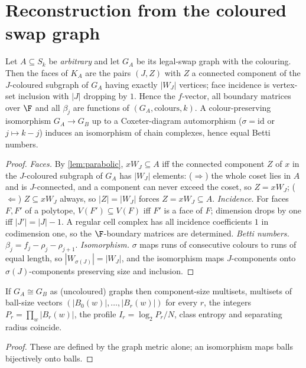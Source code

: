 \section{Reconstruction from the coloured swap graph}
\begin{theorem}[reconstruction of $K_A$]\label{thm:swap-reconstruction}
Let $A\subseteq S_k$ be \emph{arbitrary} and let $G_A$ be its legal-swap graph with the colouring. Then the faces of $K_A$ are the pairs $(J,Z)$ with $Z$ a connected component of the $J$-coloured subgraph of $G_A$ having exactly $|W_J|$ vertices; face incidence is vertex-set inclusion with $|J|$ dropping by $1$. Hence the $f$-vector, all boundary matrices over $\F$ and all $\beta_j$ are functions of $(G_A,\text{colours},k)$. A colour-preserving isomorphism $G_A\to G_B$ up to a Coxeter-diagram automorphism ($\sigma=\mathrm{id}$ or $j\mapsto k-j$) induces an isomorphism of chain complexes, hence equal Betti numbers.
\end{theorem}
\begin{proof}
\emph{Faces.} By \cref{lem:parabolic}, $xW_J\subseteq A$ iff the connected component $Z$ of $x$ in the $J$-coloured subgraph of $G_A$ has $|W_J|$ elements: ($\Rightarrow$) the whole coset lies in $A$ and is $J$-connected, and a component can never exceed the coset, so $Z=xW_J$; ($\Leftarrow$) $Z\subseteq xW_J$ always, so $|Z|=|W_J|$ forces $Z=xW_J\subseteq A$. \emph{Incidence.} For faces $F,F'$ of a polytope, $V(F')\subseteq V(F)$ iff $F'$ is a face of $F$; dimension drops by one iff $|J'|=|J|-1$. A regular cell complex has all incidence coefficients $1$ in codimension one, so the $\F$-boundary matrices are determined. \emph{Betti numbers.} $\beta_j=f_j-\rho_j-\rho_{j+1}$. \emph{Isomorphism.} $\sigma$ maps runs of consecutive colours to runs of equal length, so $|W_{\sigma(J)}|=|W_J|$, and the isomorphism maps $J$-components onto $\sigma(J)$-components preserving size and inclusion.
\end{proof}
\begin{proposition}\label{prop:iso-profiles}
If $G_A\cong G_B$ as (uncoloured) graphs then component-size multisets, multisets of ball-size vectors $(|B_0(w)|,\dots,|B_r(w)|)$ for every $r$, the integers $P_r=\prod_w|B_r(w)|$, the profile $I_r=\log_2P_r/N$, class entropy and separating radius coincide.
\end{proposition}
\begin{proof}
These are defined by the graph metric alone; an isomorphism maps balls bijectively onto balls.
\end{proof}

